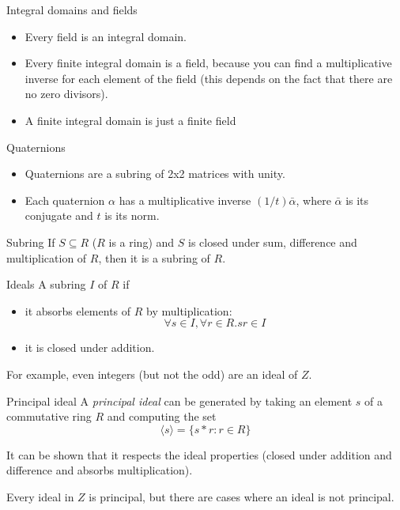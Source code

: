 \documentclass[presentation]{beamer}
\begin{document}
\begin{frame}[label={sec:orgcf4115f}]{Integral domains and fields}
\begin{itemize}
\item Every field is an integral domain.

\item Every \alert{finite} integral domain is a field, because you can find a
multiplicative inverse for each element of the field (this depends on the
fact that there are no zero divisors).

\item A \alert{finite integral domain} is just a \alert{finite field}
\end{itemize}
\end{frame}


\begin{frame}[label={sec:orgbb840e1}]{Quaternions}
\begin{itemize}
\item Quaternions are a subring of 2x2 matrices with unity.

\item Each quaternion \(\alpha\) has a multiplicative inverse \((1/t)\bar{\alpha}\),
where \(\bar{\alpha}\) is its conjugate and \(t\) is its norm.
\end{itemize}
\end{frame}

\begin{frame}[label={sec:orgae7c59f}]{Subring}
If \(S \subseteq R\) (\(R\) is a ring) and \(S\) is closed under sum, difference
and multiplication of \(R\), then it is a subring of \(R\).
\end{frame}

\begin{frame}[label={sec:org1a5e388}]{Ideals}
A subring \(I\) of \(R\) if

\begin{itemize}
\item it absorbs elements of \(R\) by multiplication: $$\forall s \in I, \forall r
      \in R. sr \in I$$
\item it is closed under addition.
\end{itemize}

For example, even integers (but not the odd) are an ideal of \(Z\).
\end{frame}

\begin{frame}[label={sec:org576eba3}]{Principal ideal}
A \emph{principal ideal} can be generated by taking an element \(s\) of a commutative
ring \(R\) and computing the set $$ \langle s \rangle = \{ s * r: r \in R \}$$

It can be shown that it respects the ideal properties (closed under addition
and difference and absorbs multiplication).

Every ideal in \(Z\) is principal, but there are cases where an ideal is not principal.
\end{frame}
\end{document}
